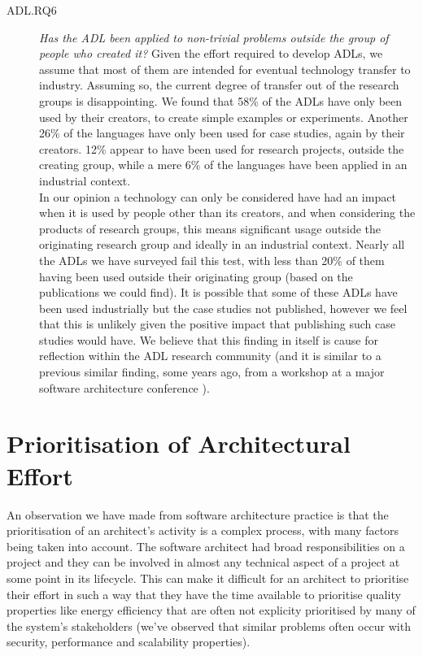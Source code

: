 \begin{description}
\item[ADL.RQ6] \emph{Has the ADL been applied to non-trivial problems outside the group of people who created it?}
Given the effort required to develop ADLs, we assume that most of them are intended for eventual technology transfer to industry.  Assuming so, the current degree of transfer out of the research groups is disappointing.  We found that 58\% of the ADLs have only been used by their creators, to create simple examples or experiments.  Another 26\% of the languages have only been used for case studies, again by their creators.  12\% appear to have been used for research projects, outside the creating group, while a mere 6\% of the languages have been applied in an industrial context. \\
In our opinion a technology can only be considered have had an impact when it is used by people other than its creators, and when considering the products of research groups, this means significant usage outside the originating research group and ideally in an industrial context.  Nearly all the ADLs we have surveyed fail this test, with less than 20\% of them having been used outside their originating group (based on the publications we could find).  It is possible that some of these ADLs have been used industrially but the case studies not published, however we feel that this is unlikely given the positive impact that publishing such case studies would have.  We believe that this finding in itself is cause for reflection within the ADL research community (and it is similar to a previous similar finding, some years ago, from a workshop at a major software architecture conference \cite{woodshilliard2005-adlsinpractice}).
\end{description}

\section{Prioritisation of Architectural Effort}
\label{section:litreview-prioritisation}

An observation we have made from software architecture practice is that the prioritisation of an architect's activity is a complex process, with many factors being taken into account. The software architect had broad responsibilities on a project and they can be involved in almost any technical aspect of a project at some point in its lifecycle. This can make it difficult for an architect to prioritise their effort in such a way that they have the time available to prioritise quality properties like energy efficiency that are often not explicity prioritised by many of the system's stakeholders (we've observed that similar problems often occur with security, performance and scalability properties).

